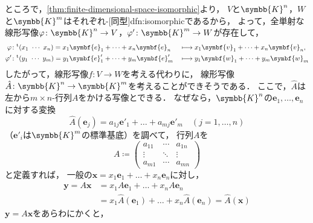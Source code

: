 \documentclass[../sotsu.tex]{subfiles}
\begin{document}
ところで，\cref{thm:finite-dimensional-space-isomorphic}より，
$V$と$\symbb{K}^n$，$W$と$\symbb{K}^m$はそれぞれ-[同型]{dfn:isomorphic}であるから，
よって，全単射な線形写像$\varphi \colon \symbb{K}^n \to V$，$\varphi' \colon \symbb{K}^m \to W$が存在して，
\begin{alignat*}{3}
    \varphi  &\colon 
        \tp{ (x_1 \  \cdots \  x_n) }
        = x_1 \symbf{e}_1  + \dots + x_n \symbf{e}_n
        &&\longmapsto x_1 \symbf{v}_1 + \dots + x_n \symbf{v}_n,
    \\
    \varphi' &\colon \tp{ (y_1 \  \cdots \  y_m) }
        = y_1 \symbf{e}'_1 + \dots + y_m \symbf{e}'_m
        &&\longmapsto y_1 \symbf{w}_1 + \dots + y_m \symbf{w}_m
\end{alignat*}
したがって，線形写像$f \colon V \to W$を考える代わりに，
線形写像$\hat{A} \colon \symbb{K}^n \to \symbb{K}^m$を考えることができそうである．
ここで，$\hat{A}$は左から$m \times n$-行列$A$をかける写像とできる．
なぜなら，$\symbb{K}^n$の$\symbf{e}_1, \dots, \symbf{e}_n$に対する変換
\begin{equation*}
    \hat{A} (\symbf{e}_j) = a_{1j} \symbf{e}'_1 + \dots + a_{mj} \symbf{e}'_m
    \quad 
    (j = 1, \dots, n)
\end{equation*}
（$\symbf{e}'_i$は$\symbb{K}^m$の標準基底）を調べて，
行列$A$を
\begin{equation*}
    A \coloneq 
    \begin{pmatrix}
        a_{11}  &  \cdots  &  a_{1n}  \\
        \vdots  &  \ddots  &  \vdots  \\
        a_{m1}  &  \cdots  &  a_{mn}
    \end{pmatrix}
\end{equation*}
と定義すれば，
一般の$\symbf{x} = x_1 \symbf{e}_1 + \dots + x_n \symbf{e}_n$に対し，
\begin{equation*}
    \begin{split}
        \symbf{y} 
            = A \symbf{x}
            &= x_1 A \symbf{e}_1 + \dots + x_n A \symbf{e}_n
            \\
            &= x_1 \hat{A} (\symbf{e}_1) + \dots + x_n \hat{A} (\symbf{e}_n)
            = \hat{A} (\symbf{x})
    \end{split}
\end{equation*}
$\symbf{y} = A \symbf{x}$をあらわにかくと，
\end{document}
